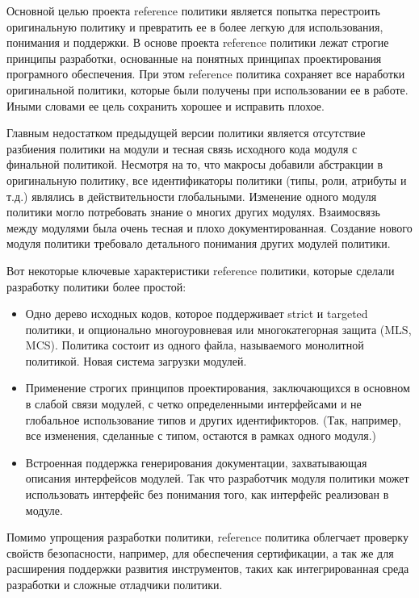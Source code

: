 \documentclass{./../class/UIR}
\begin{document}
	Основной целью проекта reference политики является попытка перестроить
	оригинальную политику и превратить ее в более легкую для использования,
	понимания и поддержки. В основе проекта reference политики лежат строгие
	принципы разработки, основанные на понятных принципах проектирования
	програмного обеспечения. При этом reference политика сохраняет все наработки
	оригинальной политики, которые были получены при использовании ее в работе.
	Иными словами ее цель сохранить хорошее и исправить плохое.
	
	Главным недостатком предыдущей версии политики является отсутствие разбиения
	политики на модули и тесная связь исходного кода модуля с финальной политикой.
	Несмотря на то, что макросы добавили абстракции в оригинальную политику, все
	идентификаторы политики (типы, роли, атрибуты и т.д.) являлись в
	действительности глобальными. Изменение одного модуля политики могло
	потребовать знание о многих других модулях. Взаимосвязь между модулями была
	очень тесная и плохо документированная. Создание нового модуля политики
	требовало детального понимания других модулей политики.
	
	Вот некоторые ключевые характеристики reference политики, которые сделали
	разработку политики более простой:
	
	\begin{itemize}
	  \item Одно дерево исходных кодов, которое поддерживает strict и targeted
	  политики, и опционально многоуровневая или многокатегорная защита (MLS, MCS).
	   Политика состоит из одного файла, называемого монолитной политикой. Новая 
	   система загрузки модулей.
	  \item Применение строгих принципов проектирования, заключающихся в
	   основном в слабой связи модулей, с четко определенными интерфейсами и не 
	   глобальное использование типов и других идентификторов. (Так, например, все
	   изменения, сделанные с типом, остаются в рамках одного модуля.)
	  \item Встроенная поддержка генерирования документации, захватывающая 
	  описания интерфейсов модулей. Так что разработчик модуля политики может 
	  использовать интерфейс без понимания того, как интерфейс реализован в модуле.
	\end{itemize}
	
	Помимо упрощения разработки политики, reference политика облегчает проверку
	свойств безопасности, например, для обеспечения сертификации, а так же для 
	расширения поддержки развития инструментов, таких как интегрированная среда 
	разработки и сложные отладчики политики.
	
\end{document}
